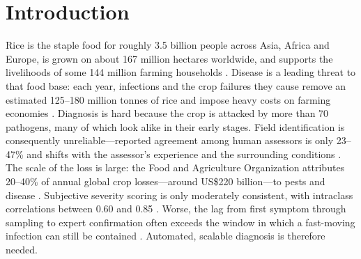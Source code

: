 \documentclass[pdflatex,sn-mathphys-num]{sn-jnl}%
\begin{document}

\maketitle

\section{Introduction}\label{sec:introduction}

Rice is the staple food for roughly 3.5 billion people across Asia, Africa and Europe, is grown on about 167 million hectares worldwide, and supports the livelihoods of some 144 million farming households \cite{kamilaris2018deep}. Disease is a leading threat to that food base: each year, infections and the crop failures they cause remove an estimated 125--180 million tonnes of rice and impose heavy costs on farming economies \cite{savary2019global,rahman2020deep}. Diagnosis is hard because the crop is attacked by more than 70 pathogens, many of which look alike in their early stages. Field identification is consequently unreliable---reported agreement among human assessors is only 23--47\% and shifts with the assessor's experience and the surrounding conditions \cite{bock2021severity,nutter1993assessing}. The scale of the loss is large: the Food and Agriculture Organization attributes 20--40\% of annual global crop losses---around US\$220 billion---to pests and disease \cite{fao2020planthealth,fao2021pests}. Subjective severity scoring is only moderately consistent, with intraclass correlations between 0.60 and 0.85 \cite{mrisho2020accuracy,oerke2020sensor}. Worse, the lag from first symptom through sampling to expert confirmation often exceeds the window in which a fast-moving infection can still be contained \cite{ristaino2021persistent}. Automated, scalable diagnosis is therefore needed.
\end{document}
